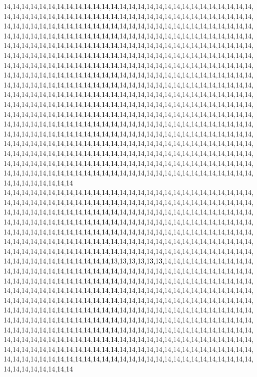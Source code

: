 14,14,14,14,14,14,14,14,14,14,14,14,14,14,14,14,14,14,14,14,14,14,14,14,14,14,14,14,14,14,14,14,14,14,14,14,14,14,14,14,14,14,14,14,14,14,14,14,14,14,14,14,14,14,14,14,14,14,14,14,14,14,14,14,14,14,14,14,14,14,14,14,14,14,14,14,14,14,14,14,14,14,14,14,14,14,14,14,14,14,14,14,14,14,14,14,14,14,14,14,14,14,14,14,14,14,14,14,14,14,14,14,14,14,14,14,14,14,14,14,14,14,14,14,14,14,14,14,14,14,14,14,14,14,14,14,14,14,14,14,14,14,14,14,14,14,14,14,14,14,14,14,14,14,14,14,14,14,14,14,14,14,14,14,14,14,14,14,14,14,14,14,14,14,14,14,14,14,14,14,14,14,14,14,14,14,14,14,14,14,14,14,14,14,14,14,14,14,14,14,14,14,14,14,14,14,14,14,14,14,14,14,14,14,14,14,14,14,14,14,14,14,14,14,14,14,14,14,14,14,14,14,14,14,14,14,14,14,14,14,14,14,14,14,14,14,14,14,14,14,14,14,14,14,14,14,14,14,14,14,14,14,14,14,14,14,14,14,14,14,14,14,14,14,14,14,14,14,14,14,14,14,14,14,14,14,14,14,14,14,14,14,14,14,14,14,14,14,14,14,14,14,14,14,14,14,14,14,14,14,14,14,14,14,14,14,14,14,14,14,14,14,14,14,14,14,14,14,14,14,14,14,14,14,14,14,14,14,14,14,14,14,14,14,14,14,14,14,14,14,14,14,14,14,14,14,14,14,14,14,14,14,14,14,14,14,14,14,14,14,14,14,14,14,14,14,14,14,14,14,14,14,14,14,14,14,14,14,14,14,14,14,14,14,14,14,14,14,14,14,14,14,14,14,14,14,14,14,14,14,14,14,14,14,14,14,14,14,14,14,14,14,14,14,14,14,14,14,14,14,14,14,14,14,14,14,14,14,14,14,14,14,14,14,14,14,14,14,14,14,14,14,14,14,14,14,14,14,14,14,14,14,14,14,14,14,14,14,14,14,14,14,14,14,14,14,14,14,14,14,14,14,14,14,14,14,14,14,14,14,14,14,14,14,14,14,14,14,14,14,14,14,14,14,14,14,14,14,14,14,14,14
14,14,14,14,14,14,14,14,14,14,14,14,14,14,14,14,14,14,14,14,14,14,14,14,14,14,14,14,14,14,14,14,14,14,14,14,14,14,14,14,14,14,14,14,14,14,14,14,14,14,14,14,14,14,14,14,14,14,14,14,14,14,14,14,14,14,14,14,14,14,14,14,14,14,14,14,14,14,14,14,14,14,14,14,14,14,14,14,14,14,14,14,14,14,14,14,14,14,14,14,14,14,14,14,14,14,14,14,14,14,14,14,14,14,14,14,14,14,14,14,14,14,14,14,14,14,14,14,14,14,14,14,14,14,14,14,14,14,14,14,14,14,14,14,14,14,14,14,14,14,14,14,14,14,14,14,14,14,14,14,14,14,14,14,14,14,14,14,14,14,14,14,14,14,14,14,14,14,14,14,14,14,14,14,14,14,14,14,14,14,14,14,14,14,14,14,14,14,14,14,14,14,14,14,14,14,14,14,13,13,13,13,13,13,14,14,14,14,14,14,14,14,14,14,14,14,14,14,14,14,14,14,14,14,14,14,14,14,14,14,14,14,14,14,14,14,14,14,14,14,14,14,14,14,14,14,14,14,14,14,14,14,14,14,14,14,14,14,14,14,14,14,14,14,14,14,14,14,14,14,14,14,14,14,14,14,14,14,14,14,14,14,14,14,14,14,14,14,14,14,14,14,14,14,14,14,14,14,14,14,14,14,14,14,14,14,14,14,14,14,14,14,14,14,14,14,14,14,14,14,14,14,14,14,14,14,14,14,14,14,14,14,14,14,14,14,14,14,14,14,14,14,14,14,14,14,14,14,14,14,14,14,14,14,14,14,14,14,14,14,14,14,14,14,14,14,14,14,14,14,14,14,14,14,14,14,14,14,14,14,14,14,14,14,14,14,14,14,14,14,14,14,14,14,14,14,14,14,14,14,14,14,14,14,14,14,14,14,14,14,14,14,14,14,14,14,14,14,14,14,14,14,14,14,14,14,14,14,14,14,14,14,14,14,14,14,14,14,14,14,14,14,14,14,14,14,14,14,14,14,14,14,14,14,14,14,14,14,14,14,14,14,14,14,14,14,14,14,14,14,14,14,14,14,14,14,14,14,14,14,14,14,14,14,14,14,14,14,14,14,14,14,14,14,14,14,14,14,14,14,14,14

